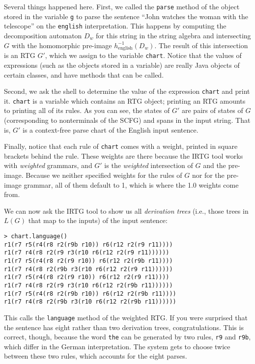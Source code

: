 \documentclass[11pt]{article}
\begin{document}
Several things happened here. First, we called the \verb?parse? method
of the object stored in the variable \verb?g? to parse the sentence
``John watches the woman with the telescope'' on the \verb?english?
interpretation. This happens by computing the decomposition automaton
$D_w$ for this string in the string algebra and intersecting $G$ with
the homomorphic pre-image $h_\mathrm{english}^{-1}(D_w)$. The result of
this intersection is an RTG $G'$, which we assign to the variable
\verb?chart?. Notice that the values of expressions (such as the
objects stored in a variable) are really Java objects of certain
classes, and have methods that can be called.

Second, we ask the shell to determine the value of the expression
\verb?chart? and print it. \verb?chart? is a variable which contains
an RTG object; printing an RTG amounts to printing all of its rules.
As you can see, the states of $G'$ are pairs of states of $G$
(corresponding to nonterminals of the SCFG) and spans in the input
string. That is, $G'$ is a context-free parse chart of the English
input sentence.

Finally, notice that each rule of \verb?chart? comes with a weight,
printed in square brackets behind the rule. These weights are there
because the IRTG tool works with \emph{weighted} grammars, and $G'$ is
the \emph{weighted} intersection of $G$ and the pre-image. Because we
neither specified weights for the rules of $G$ nor for the pre-image
grammar, all of them default to 1, which is where the 1.0 weights come
from.

We can now ask the IRTG tool to show us all \emph{derivation trees}
(i.e., those trees in $L(G)$ that map to the inputs) of the input
sentence:

\begin{verbatim}
> chart.language()
r1(r7 r5(r4(r8 r2(r9b r10)) r6(r12 r2(r9 r11))))
r1(r7 r4(r8 r2(r9 r3(r10 r6(r12 r2(r9 r11))))))
r1(r7 r5(r4(r8 r2(r9 r10)) r6(r12 r2(r9b r11))))
r1(r7 r4(r8 r2(r9b r3(r10 r6(r12 r2(r9 r11))))))
r1(r7 r5(r4(r8 r2(r9 r10)) r6(r12 r2(r9 r11))))
r1(r7 r4(r8 r2(r9 r3(r10 r6(r12 r2(r9b r11))))))
r1(r7 r5(r4(r8 r2(r9b r10)) r6(r12 r2(r9b r11))))
r1(r7 r4(r8 r2(r9b r3(r10 r6(r12 r2(r9b r11))))))
\end{verbatim}

This calls the \verb?language? method of the weighted RTG. If you
were surprised that the sentence has eight rather than two derivation
trees, congratulations. This is correct, though, because the word
\verb?the? can be generated by two rules, \verb?r9? and \verb?r9b?,
which differ in the German interpretation. The system gets to choose
twice between these two rules, which accounts for the eight parses.
\end{document}
